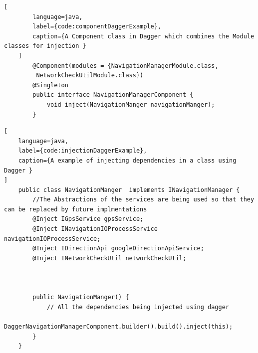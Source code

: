     \newpage
    \begin{lstlisting}[
        language=java,
        label={code:componentDaggerExample},
        caption={A Component class in Dagger which combines the Module classes for injection }
    ]
        @Component(modules = {NavigationManagerModule.class,
         NetworkCheckUtilModule.class})
        @Singleton
        public interface NavigationManagerComponent {
            void inject(NavigationManger navigationManger);
        }

\end{lstlisting}

\newpage
\begin{lstlisting}[
    language=java,
    label={code:injectionDaggerExample},
    caption={A example of injecting dependencies in a class using Dagger }
]
    public class NavigationManger  implements INavigationManager {
        //The Abstractions of the services are being used so that they can be replaced by future implmentations
        @Inject IGpsService gpsService;
        @Inject INavigationIOProcessService navigationIOProcessService;
        @Inject IDirectionApi googleDirectionApiService;
        @Inject INetworkCheckUtil networkCheckUtil;



        public NavigationManger() {
            // All the dependencies being injected using dagger
            DaggerNavigationManagerComponent.builder().build().inject(this);
        }
    } 
\end{lstlisting}